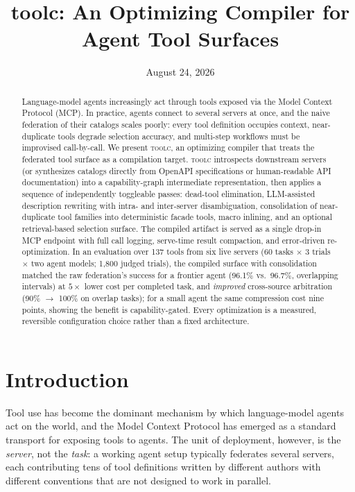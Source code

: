 \documentclass[11pt]{article}
\title{toolc: An Optimizing Compiler for Agent Tool Surfaces}
\date{August 24, 2026}
\begin{document}
\maketitle

\begin{abstract}
Language-model agents increasingly act through tools exposed via the Model
Context Protocol (MCP). In practice, agents connect to several servers at
once, and the naive federation of their catalogs scales poorly: every tool
definition occupies context, near-duplicate tools degrade selection accuracy,
and multi-step workflows must be improvised call-by-call. We present
\textsc{toolc}, an optimizing compiler that treats the federated tool surface
as a compilation target. \textsc{toolc} introspects downstream servers (or
synthesizes catalogs directly from OpenAPI specifications or human-readable
API documentation) into a capability-graph intermediate representation, then
applies a sequence of independently toggleable passes: dead-tool elimination,
LLM-assisted description rewriting with intra- and inter-server
disambiguation, consolidation of near-duplicate tool families into
deterministic facade tools, macro inlining, and an optional retrieval-based
selection surface. The compiled artifact is served as a single drop-in MCP
endpoint with full call logging, serve-time result compaction, and
error-driven re-optimization. In an evaluation over 137 tools from six live servers (60 tasks
$\times$ 3 trials $\times$ two agent models; 1{,}800 judged trials), the
compiled surface with consolidation matched the raw federation's success for
a frontier agent (96.1\% vs.\ 96.7\%, overlapping intervals) at $5\times$
lower cost per completed task, and \emph{improved} cross-source arbitration
(90\% $\rightarrow$ 100\% on overlap tasks); for a small agent the same
compression cost nine points, showing the benefit is capability-gated. Every optimization
is a measured, reversible configuration choice rather than a fixed
architecture.
\end{abstract}

\section{Introduction}

Tool use has become the dominant mechanism by which language-model agents act
on the world, and the Model Context Protocol has emerged as a standard
transport for exposing tools to agents. The unit of deployment, however, is
the \emph{server}, not the \emph{task}: a working agent setup typically
federates several servers, each contributing tens of tool definitions written
by different authors with different conventions that are not designed to work in parallel.
\end{document}
